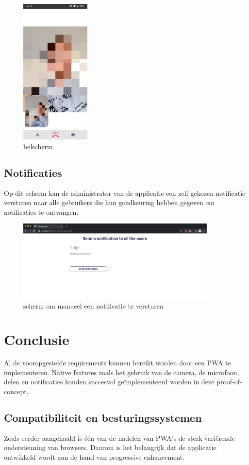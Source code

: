	
		\begin{figure}[H]
			\centering
			\includegraphics[width=35mm]{./img/POC/call.jpg}{}		
			\caption{belscherm}
		\end{figure}
		
	\subsection{Notificaties}
		Op dit scherm kan de administrator van de applicatie een zelf gekozen notificatie versturen naar alle gebruikers die hun goedkeuring hebben gegeven om notificaties te ontvangen.
		
		\begin{figure}[H]
			\centering
			\includegraphics[width=100mm]{./img/POC/sendNoti}{}		
			\caption{scherm om manueel een notificatie te versturen}
		\end{figure}
		

\section{Conclusie}
	
	Al de vooropgestelde requirements kunnen bereikt worden door een PWA te implementeren. 
	Native features zoals het gebruik van de camera, de microfoon, delen en notificaties konden succesvol geïmplementeerd worden in deze proof-of-concept.
	
	\subsection{Compatibiliteit en besturingssystemen}
		Zoals eerder aangehaald is één van de nadelen van PWA's de sterk variërende ondersteuning van browsers. Daarom is het belangrijk dat de applicatie ontwikkeld wordt aan de hand van progressive enhancement. 
		
